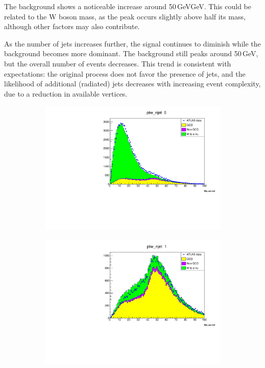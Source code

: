     The background shows a noticeable increase around 50\,GeVGeV. This could be related to the W boson mass, as the peak occurs slightly above half its mass,
    although other factors may also contribute.

    As the number of jets increases further, the signal continues to diminish while the background becomes more dominant.
    The background still peaks around 50\,GeV, but the overall number of events decreases.
    This trend is consistent with expectations: the original process does not favor the presence of jets,
    and the likelihood of additional (radiated) jets decreases with increasing event complexity, due to a reduction in available vertices.
    \begin{figure}[H]
        \begin{subfigure}{0.5\textwidth}
            \includegraphics[width=\textwidth]{../W_mass/ptw_njet0.pdf}
        \end{subfigure}
        \begin{subfigure}{0.5\textwidth}
            \includegraphics[width=\textwidth]{../W_mass/ptw_njet1.pdf}

\end{subfigure}
\end{figure}
